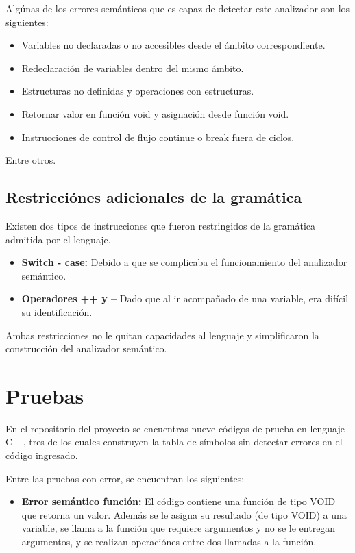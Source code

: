 \documentclass[12pt]{article}
\begin{document}
\begin{itemize}
Alg\'unas de los errores sem\'anticos que es capaz de detectar este analizador son los siguientes:
\begin{itemize}
    \item Variables no declaradas o no accesibles desde el \'ambito correspondiente.
    \item Redeclaraci\'on de variables dentro del mismo \'ambito.
    \item Estructuras no definidas y operaciones con estructuras.
    \item Retornar valor en funci\'on void y asignaci\'on desde funci\'on void.
    \item Instrucciones de control de flujo continue o break fuera de ciclos.
\end{itemize}

Entre otros.

\clearpage
\subsection*{Restricci\'ones adicionales de la gramática}

Existen dos tipos de instrucciones que fueron restringidos de la gramática admitida por el lenguaje.

\begin{itemize}
    \item \textbf{Switch - case: } Debido a que se complicaba el funcionamiento del analizador semántico.
    \item \textbf{Operadores ++ y --} Dado que al ir acompañado de una variable, era dif\'icil su identificación.
\end{itemize}
Ambas restricciones no le quitan capacidades al lenguaje y simplificaron la construcción del analizador semántico.


\section*{Pruebas}
En el repositorio del proyecto se encuentras nueve c\'odigos de prueba en lenguaje C+-, tres de los cuales construyen la tabla de s\'imbolos sin detectar errores en el código ingresado.

Entre las pruebas con error, se encuentran los siguientes:
\begin{itemize}
    
\item \textbf{Error semántico función: } El código contiene una función de tipo VOID que retorna un valor. Además se le asigna su resultado (de tipo VOID) a una variable, se llama a la función que requiere argumentos y no se le entregan argumentos, y se realizan operaciónes entre dos llamadas a la función.


\end{itemize}
\end{itemize}
\end{document}
